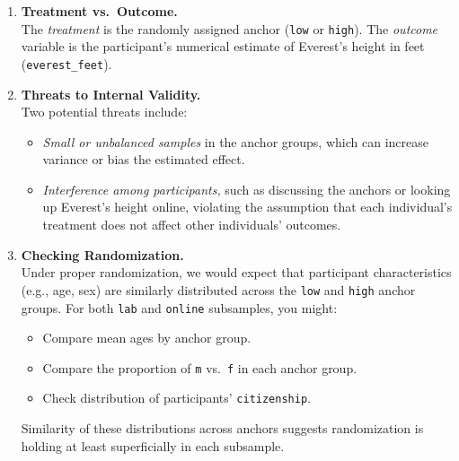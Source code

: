 \documentclass[12pt]{article}
\begin{document}
\begin{enumerate}
  \item \textbf{Treatment vs.\ Outcome.}\\
  The \emph{treatment} is the randomly assigned anchor (\texttt{low} or \texttt{high}). The \emph{outcome} variable is the participant’s numerical estimate of Everest’s height in feet (\texttt{everest\_feet}).

  \item \textbf{Threats to Internal Validity.}\\
  Two potential threats include:
  \begin{itemize}
    \item \emph{Small or unbalanced samples} in the anchor groups, which can increase variance or bias the estimated effect.
    \item \emph{Interference among participants,} such as discussing the anchors or looking up Everest’s height online, violating the assumption that each individual’s treatment does not affect other individuals’ outcomes.
  \end{itemize}


  \item \textbf{Checking Randomization.}\\
  Under proper randomization, we would expect that participant characteristics (e.g., age, sex) are similarly distributed across the \texttt{low} and \texttt{high} anchor groups. For both \texttt{lab} and \texttt{online} subsamples, you might:
  \begin{itemize}
    \item Compare mean ages by anchor group.
    \item Compare the proportion of \texttt{m} vs.\ \texttt{f} in each anchor group.
    \item Check distribution of participants' \texttt{citizenship}.
  \end{itemize}
  Similarity of these distributions across anchors suggests randomization is holding at least superficially in each subsample.


\end{enumerate}
\end{document}
